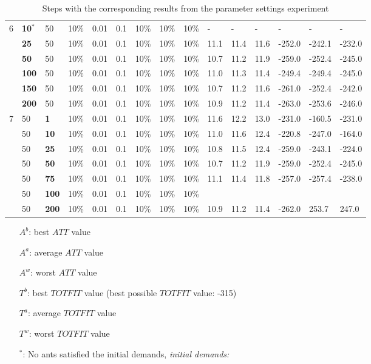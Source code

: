 \begin{table}
\begin{tabular}{|l|l|l|l|l|l|l|l|l||l|l|l|l|l|l|}
    \hline
    6 & \textbf{10$^*$} & 50 & 10\% & 0.01 & 0.1 & 10\% & 10\% & 10\% & - & - & - & - & - & - \\
    ~ & \textbf{25} & 50 & 10\% & 0.01 & 0.1 & 10\% & 10\% & 10\% & 11.1 & 11.4 & 11.6 & -252.0 & -242.1 & -232.0 \\
    ~ & \textbf{50} & 50 & 10\% & 0.01 & 0.1 & 10\% & 10\% & 10\% & 10.7 & 11.2 & 11.9 & -259.0 & -252.4 & -245.0 \\
    ~ & \textbf{100} & 50 & 10\% & 0.01 & 0.1 & 10\% & 10\% & 10\% & 11.0 & 11.3 & 11.4 & -249.4 & -249.4 & -245.0 \\
    ~ & \textbf{150} & 50 & 10\% & 0.01 & 0.1 & 10\% & 10\% & 10\% & 10.7 & 11.2 & 11.6 & -261.0 & -252.4 & -242.0 \\
    ~ & \textbf{200} & 50 & 10\% & 0.01 & 0.1 & 10\% & 10\% & 10\% & 10.9 & 11.2 & 11.4 & -263.0 & -253.6 & -246.0 \\
    \hline
    7 & 50 & \textbf{1} & 10\% & 0.01 & 0.1 & 10\% & 10\% & 10\% & 11.6 & 12.2 & 13.0 & -231.0 & -160.5 & -231.0  \\
    ~ & 50 & \textbf{10} & 10\% & 0.01 & 0.1 & 10\% & 10\% & 10\% & 11.0 & 11.6 & 12.4 & -220.8 & -247.0 & -164.0  \\
    ~ & 50 & \textbf{25} & 10\% & 0.01 & 0.1 & 10\% & 10\% & 10\% & 10.8 & 11.5 & 12.4 & -259.0 & -243.1 & -224.0  \\
    ~ & 50 & \textbf{50} & 10\% & 0.01 & 0.1 & 10\% & 10\% & 10\% & 10.7 & 11.2 & 11.9 & -259.0 & -252.4 & -245.0 \\
    ~ & 50 & \textbf{75} & 10\% & 0.01 & 0.1 & 10\% & 10\% & 10\% & 11.1 & 11.4 & 11.8 & -257.0 & -257.4 & -238.0  \\
    ~ & 50 & \textbf{100} & 10\% & 0.01 & 0.1 & 10\% & 10\% & 10\% & ~ & ~ & ~ & ~ & ~ & ~  \\
    ~ & 50 & \textbf{200} & 10\% & 0.01 & 0.1 & 10\% & 10\% & 10\% & 10.9 & 11.2 & 11.4 & -262.0 & 253.7 & 247.0  \\

    \hline
    \end{tabular}
    \caption {Steps with the corresponding results from the parameter settings experiment} 
    \begin{itemize}[noitemsep]
    \item[$A^b$:] best $ATT$ value
    \item[$A^a$:] average $ATT$ value
    \item[$A^w$:] worst $ATT$ value
    \item[$T^b$:] best $TOTFIT$ value (best possible $TOTFIT$ value: -315)
    \item[$T^a$:] average $TOTFIT$ value
    \item[$T^w$:] worst $TOTFIT$ value
    \item[$^*$:] No ants satisfied the initial demands, \emph{\color{red} initial demands: }
    \end{itemize}
    \label{table:parameterSettings}
\end{table}

